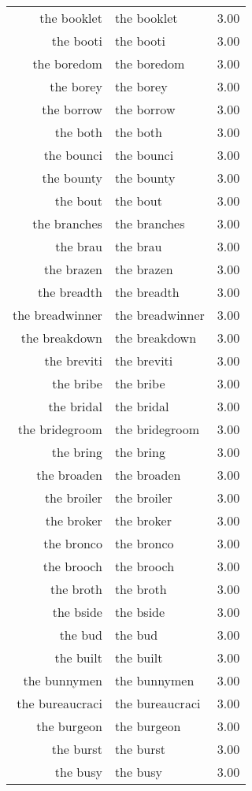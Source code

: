 \begin{table}[ht]
\begin{tabular}{rlr}
  the booklet & the booklet & 3.00 \\ 
  the booti & the booti & 3.00 \\ 
  the boredom & the boredom & 3.00 \\ 
  the borey & the borey & 3.00 \\ 
  the borrow & the borrow & 3.00 \\ 
  the both & the both & 3.00 \\ 
  the bounci & the bounci & 3.00 \\ 
  the bounty & the bounty & 3.00 \\ 
  the bout & the bout & 3.00 \\ 
  the branches & the branches & 3.00 \\ 
  the brau & the brau & 3.00 \\ 
  the brazen & the brazen & 3.00 \\ 
  the breadth & the breadth & 3.00 \\ 
  the breadwinner & the breadwinner & 3.00 \\ 
  the breakdown & the breakdown & 3.00 \\ 
  the breviti & the breviti & 3.00 \\ 
  the bribe & the bribe & 3.00 \\ 
  the bridal & the bridal & 3.00 \\ 
  the bridegroom & the bridegroom & 3.00 \\ 
  the bring & the bring & 3.00 \\ 
  the broaden & the broaden & 3.00 \\ 
  the broiler & the broiler & 3.00 \\ 
  the broker & the broker & 3.00 \\ 
  the bronco & the bronco & 3.00 \\ 
  the brooch & the brooch & 3.00 \\ 
  the broth & the broth & 3.00 \\ 
  the bside & the bside & 3.00 \\ 
  the bud & the bud & 3.00 \\ 
  the built & the built & 3.00 \\ 
  the bunnymen & the bunnymen & 3.00 \\ 
  the bureaucraci & the bureaucraci & 3.00 \\ 
  the burgeon & the burgeon & 3.00 \\ 
  the burst & the burst & 3.00 \\ 
  the busy & the busy & 3.00 \\ 

\end{tabular}
\end{table}

